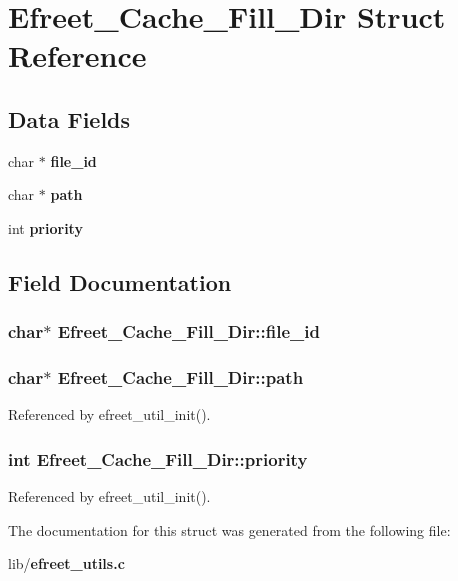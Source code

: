 \section{Efreet\_\-Cache\_\-Fill\_\-Dir Struct Reference}
\label{structEfreet__Cache__Fill__Dir}
\subsection*{Data Fields}
\begin{CompactItemize}
\item 
char $\ast$ {\bf file\_\-id}
\item 
char $\ast$ {\bf path}
\item 
int {\bf priority}
\end{CompactItemize}


\subsection{Field Documentation}
\subsubsection{\setlength{\rightskip}{0pt plus 5cm}char$\ast$ {\bf Efreet\_\-Cache\_\-Fill\_\-Dir::file\_\-id}}\label{structEfreet__Cache__Fill__Dir_04bd334e812e54233e93f4da517b4795}


\subsubsection{\setlength{\rightskip}{0pt plus 5cm}char$\ast$ {\bf Efreet\_\-Cache\_\-Fill\_\-Dir::path}}\label{structEfreet__Cache__Fill__Dir_922aae798beba37998ba965356d67cc4}




Referenced by efreet\_\-util\_\-init().
\subsubsection{\setlength{\rightskip}{0pt plus 5cm}int {\bf Efreet\_\-Cache\_\-Fill\_\-Dir::priority}}\label{structEfreet__Cache__Fill__Dir_48d19b19a1a992c1baa56dc222216c66}




Referenced by efreet\_\-util\_\-init().

The documentation for this struct was generated from the following file:\begin{CompactItemize}
\item 
lib/{\bf efreet\_\-utils.c}\end{CompactItemize}
